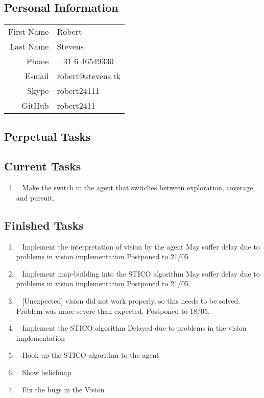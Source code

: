 \subsection{Personal Information}
\begin{table}[h!]
	\begin{tabular}{rl}
	First Name 	& Robert\\
	Last Name	& Stevens\\
	Phone		& +31 6 46549330\\
	E-mail		& robert@stevens.tk\\
	Skype		& robert24111\\
	GitHub		& robert2411
\end{tabular}
\end{table}

\subsection{Perpetual Tasks}

\subsection{Current Tasks}
\begin{enumerate}
	\item~
		Make the switch in the agent that switches between exploration, coverage, and pursuit.
	
\end{enumerate}

\subsection{Finished Tasks}
\begin{enumerate}
	\item~
	Implement the interpretation of vision by the agent
		\subitem May suffer delay due to problems in vision implementation
		\subitem Postponed to 21/05
	\item~
	Implement map-building into the STICO algorithm
		\subitem May suffer delay due to problems in vision implementation
		\subitem Postponed to 21/05
	\item~
	[Unexpected] vision did not work properly, so this needs to be solved.
		\subitem Problem was more severe than expected. Postponed to 18/05.
	\item~
	Implement the STICO algorithm
		\subitem Delayed due to problems in the vision implementation
	\item~
	Hook up the STICO algorithm to the agent
	\item~\marginpar{-}
		Show beliefmap
	\item~
		Fix the bugs in the Vision
\end{enumerate}
